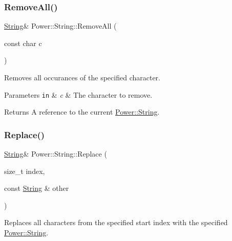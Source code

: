 \subsubsection{\texorpdfstring{Remove\+All()}{RemoveAll()}\hspace{0.1cm}{\footnotesize\ttfamily [4/4]}}
{\footnotesize\ttfamily \hyperlink{class_power_1_1_string}{String}\& Power\+::\+String\+::\+Remove\+All (\begin{DoxyParamCaption}\item[{const char}]{c }\end{DoxyParamCaption})\hspace{0.3cm}{\ttfamily [inline]}}



Removes all occurances of the specified character. 


\begin{DoxyParams}[1]{Parameters}
\mbox{\tt in}  & {\em c} & The character to remove. \\
\hline
\end{DoxyParams}
\begin{DoxyReturn}{Returns}
A reference to the current \hyperlink{class_power_1_1_string}{Power\+::\+String}. 
\end{DoxyReturn}
\mbox{\label{class_power_1_1_string_ab0a52e24022cf0b22d7af6264ecc4c98}} 
\subsubsection{\texorpdfstring{Replace()}{Replace()}\hspace{0.1cm}{\footnotesize\ttfamily [1/8]}}
{\footnotesize\ttfamily \hyperlink{class_power_1_1_string}{String}\& Power\+::\+String\+::\+Replace (\begin{DoxyParamCaption}\item[{size\+\_\+t}]{index,  }\item[{const \hyperlink{class_power_1_1_string}{String} \&}]{other }\end{DoxyParamCaption})\hspace{0.3cm}{\ttfamily [inline]}}



Replaces all characters from the specified start index with the specified \hyperlink{class_power_1_1_string}{Power\+::\+String}. 


